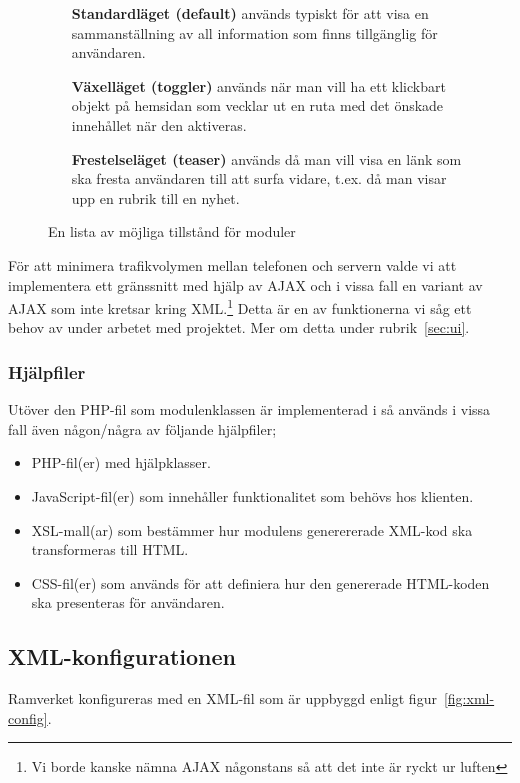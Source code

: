 \begin{figure}[h]
\begin{itemize}
  \item[{\bf Standardläget (default)}] används typiskt för att visa en
    sammanställning av all information som finns tillgänglig för användaren.
  \item[{\bf Växelläget (toggler)}] används när man vill ha ett klickbart objekt
    på hemsidan som vecklar ut en ruta med det önskade innehållet när den
    aktiveras.
  \item[{\bf Frestelseläget (teaser)}] används då man vill visa en länk som ska
    fresta användaren till att surfa vidare, t.ex. då man visar upp en rubrik
    till en nyhet.
\end{itemize}
\caption{En lista av möjliga tillstånd för moduler\label{list:modes}}
\end{figure}

För att minimera trafikvolymen mellan telefonen och servern valde vi att
implementera ett gränssnitt med hjälp av AJAX och i vissa fall en variant av
AJAX som inte kretsar kring XML.\footnote{Vi borde kanske nämna AJAX någonstans
så att det inte är ryckt ur luften} Detta är en av funktionerna vi såg ett behov
av under arbetet med projektet. Mer om detta under rubrik~\ref{sec:ui}.

\subsubsection*{Hjälpfiler}
Utöver den PHP-fil som modulenklassen är implementerad i så används i vissa fall
även någon/några av följande hjälpfiler;

\begin{itemize}
  \item PHP-fil(er) med hjälpklasser.
  \item JavaScript-fil(er) som innehåller funktionalitet som behövs hos
    klienten.
  \item XSL-mall(ar) som bestämmer hur modulens generererade XML-kod ska
    transformeras till HTML.
  \item CSS-fil(er) som används för att definiera hur den genererade HTML-koden
    ska presenteras för användaren.
\end{itemize}

\subsection{XML-konfigurationen}
Ramverket konfigureras med en XML-fil som är uppbyggd enligt
figur~\ref{fig:xml-config}.

